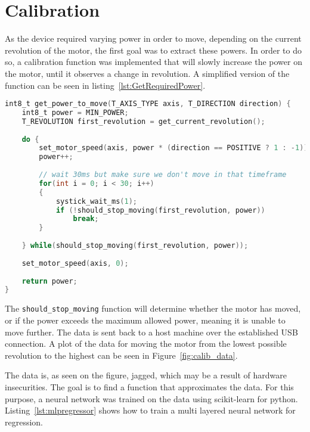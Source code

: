 \section{Calibration}

As the device required varying power in order to move, depending on the current revolution of the motor, the first goal was to extract these powers.
In order to do so, a calibration function was implemented that will slowly increase the power on the motor, until it observes a change in revolution.
A simplified version of the function can be seen in listing~\ref{lst:GetRequiredPower}.


\begin{lstlisting}[language=C,label={lst:GetRequiredPower},caption={Getting required power to move }]
int8_t get_power_to_move(T_AXIS_TYPE axis, T_DIRECTION direction) {
	int8_t power = MIN_POWER;
	T_REVOLUTION first_revolution = get_current_revolution();
	
	do {
		set_motor_speed(axis, power * (direction == POSITIVE ? 1 : -1));
		power++;
		
		// wait 30ms but make sure we don't move in that timeframe
		for(int i = 0; i < 30; i++)
		{
			systick_wait_ms(1);
			if (!should_stop_moving(first_revolution, power))
				break;
		}
	
	} while(should_stop_moving(first_revolution, power));
	
	set_motor_speed(axis, 0);
	
	return power;
}

\end{lstlisting}

The \texttt{should\_stop\_moving} function will determine whether the motor has moved, or if the power exceeds the maximum allowed power, meaning it is unable to move further.
The data is sent back to a host machine over the established USB connection.
A plot of the data for moving the motor from the lowest possible revolution to the highest can be seen in Figure~\ref{fig:calib_data}.


The data is, as seen on the figure, jagged, which may be a result of hardware insecurities.
The goal is to find a function that approximates the data.
For this purpose, a neural network was trained on the data using scikit-learn for python.
Listing~\ref{lst:mlpregressor} shows how to train a multi layered neural network for regression.


